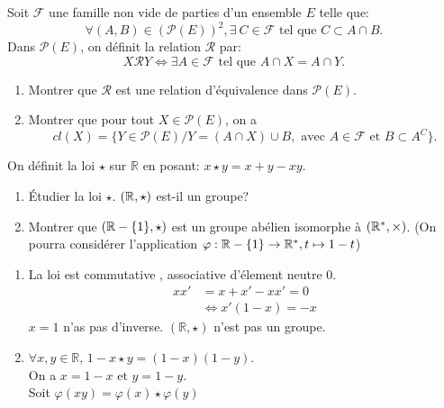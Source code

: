 \begin{exercise}[from=Devoir MPI 2017,nosol]
	Soit $\mathcal{F}$ une famille non vide de parties d'un ensemble $E$ telle que:
	\[
		\forall (A,B) \in (\mathcal{P}(E))^2,\exists~ C \in \mathcal{F} \text{ tel que } C \subset A \cap B.
	 \]
	 Dans $\mathcal{P}(E)$, on définit la relation $\mathcal{R}$ par:
	 \[
	 	X\mathcal{R}Y\Leftrightarrow \exists A \in \mathcal{F} \text{ tel que } A \cap X = A \cap Y.
	 \]
	 \begin{enumerate}
	 	\item Montrer que $\mathcal{R}$ est une relation d'équivalence dans $\mathcal{P}(E)$.
	 	\item  Montrer que pour tout $X \in \mathcal{P}(E)$, on a
	 	\[
	 		cl(X)=\{Y \in \mathcal{P}(E)/Y=(A \cap X) \cup B , \text{ avec } A \in \mathcal{F} \text{ et } B \subset A^C \}.
	 	\]
	 \end{enumerate}
\end{exercise}
\begin{exercise}[from=Devoir MPI 2017]
	On définit la loi $\star$ sur $\mathbb{R}$ en posant: $x \star y = x+y-xy$.
	\begin{enumerate}
		\item Étudier la loi $\star$. $(\mathbb{R}, \star)$ est-il un groupe?
		\item Montrer que $(\mathbb{R}-\{1\},\star)$ est un groupe abélien isomorphe à $(\mathbb{R}^*,\times)$. (On pourra considérer l'application $\varphi: \mathbb{R}-\{1\}\rightarrow \mathbb{R}^*,t \mapsto 1-t$)
	\end{enumerate}
	\cor
	\begin{enumerate}
		\item La loi est commutative , associative d'élement neutre 0.
		\begin{align*}
			xx'& = x+x'-xx'= 0\\
			   & \Leftrightarrow x'(1-x)=-x
		\end{align*}
		$x=1$ n'as pas d'inverse. $(\mathbb{R},\star)$ n'est pas un groupe.
		\item $\forall x,y \in \mathbb{R}$, $1-x \star y = (1-x)(1-y)$.
		\\On a $x=1-x \text{ et } y=1-y$.
		\\Soit $\varphi(xy)=\varphi(x) \star \varphi(y)$
	\end{enumerate}
\end{exercise}

